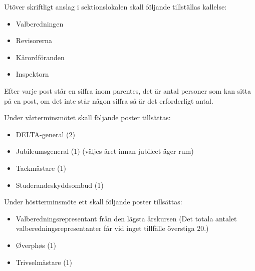 \documentclass[pdfbookmarks,a4paper,11pt]{article}
\newlength{\itemcollength}
\newenvironment{reglemlista}{%
  \begin{list}{}{%
      \setlength{\labelwidth}{\itemcollength}%
      \setlength{\leftmargin}{\labelwidth + \labelsep}%
      \renewcommand{\makelabel}[1]{%
        \raisebox{0pt}[1ex][0pt]{%
          \makebox[\labelwidth][l]{%
            \parbox[t]{\itemcollength}{%
              \raggedright\hspace{0pt}##1}}}\hfill}%
      }}{%
  \end{list}}
\begin{document}
\begin{reglemlista}

	\item[Utlysande]
	Utöver skriftligt anslag i sektionslokalen skall följande tillställas kallelse:
	\begin{itemize}
		\item Valberedningen
		\item Revisorerna
		\item Kårordföranden
		\item Inspektorn
	\end{itemize}
	
	\item[Förtydligande]
	Efter varje post står en siffra inom parentes, det är antal personer som kan sitta på en post, om det inte står någon siffra så är det erforderligt antal.

	\item[Vårterminsmöte]
	Under vårterminsmötet skall följande poster tillsättas:
	\begin{itemize}

		\item DELTA-general (2)
		\item Jubileumsgeneral (1) (väljes året innan jubileet äger rum)
		\item Tackmästare (1)
		\item Studerandeskyddsombud (1)
	\end{itemize}

	\item[Höstterminsmöte ett]
	Under höstterminsmöte ett skall följande poster tillsättas:
	\begin{itemize}
		\item Valberedningsrepresentant från den lägsta årskursen (Det totala
antalet valberedningsrepresentanter får vid inget tillfälle överstiga
20.)
		\item Øverphøs (1)
		\item Trivselmästare (1)
	\end{itemize}


\end{reglemlista}
\end{document}
